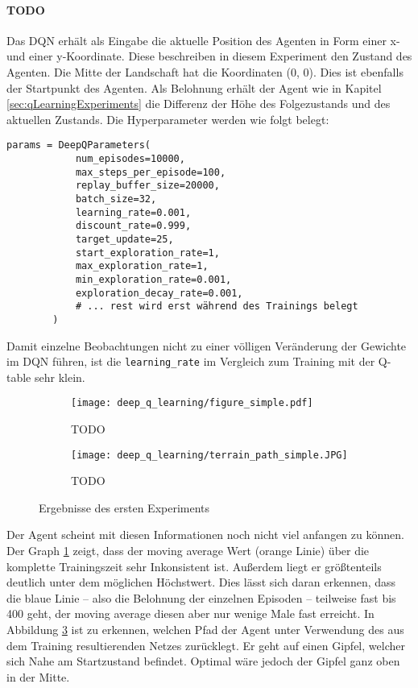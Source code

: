\paragraph{TODO}
Das DQN erhält als Eingabe die aktuelle Position des Agenten in Form einer x- und einer y-Koordinate. Diese beschreiben in diesem Experiment den Zustand des Agenten. Die Mitte der Landschaft hat die Koordinaten (0, 0). Dies ist ebenfalls der Startpunkt des Agenten. Als Belohnung erhält der Agent wie in Kapitel \ref{sec:qLearningExperiments} die Differenz der Höhe des Folgezustands und des aktuellen Zustands. Die Hyperparameter werden wie folgt belegt:
\begin{verbatim}
params = DeepQParameters(
            num_episodes=10000,
            max_steps_per_episode=100,
            replay_buffer_size=20000,
            batch_size=32,
            learning_rate=0.001,
            discount_rate=0.999,
            target_update=25,
            start_exploration_rate=1,
            max_exploration_rate=1,
            min_exploration_rate=0.001,
            exploration_decay_rate=0.001,
            # ... rest wird erst während des Trainings belegt
        )
\end{verbatim}
Damit einzelne Beobachtungen nicht zu einer völligen Veränderung der Gewichte im DQN führen, ist die \texttt{learning_rate} im Vergleich zum Training mit der Q-table sehr klein.
\begin{figure}[H]
    \centering
    \begin{subfigure}[b]{0.49\textwidth}
        \texttt{[image: deep\_q\_learning/figure\_simple.pdf]}
        \caption{TODO}
        \label{img:graphDeepQSimple}
    \end{subfigure}
    \begin{subfigure}[b]{0.49\textwidth}
        \texttt{[image: deep\_q\_learning/terrain\_path\_simple.JPG]}
        \caption{TODO}
        \label{img:pathDeepQSimple}
    \end{subfigure}
    \caption{Ergebnisse des ersten Experiments}
\end{figure}
Der Agent scheint mit diesen Informationen noch nicht viel anfangen zu können. Der Graph \ref{img:graphDeepQSimple} zeigt, dass der moving average Wert (orange Linie) über die komplette Trainingszeit sehr Inkonsistent ist. Außerdem liegt er größtenteils deutlich unter dem möglichen Höchstwert. Dies lässt sich daran erkennen, dass die blaue Linie -- also die Belohnung der einzelnen Episoden -- teilweise fast bis 400 geht, der moving average diesen aber nur wenige Male fast erreicht. In Abbildung \ref{img:pathDeepQSimple} ist zu erkennen, welchen Pfad der Agent unter Verwendung des aus dem Training resultierenden Netzes zurücklegt. Er geht auf einen Gipfel, welcher sich Nahe am Startzustand befindet. Optimal wäre jedoch der Gipfel ganz oben in der Mitte.

